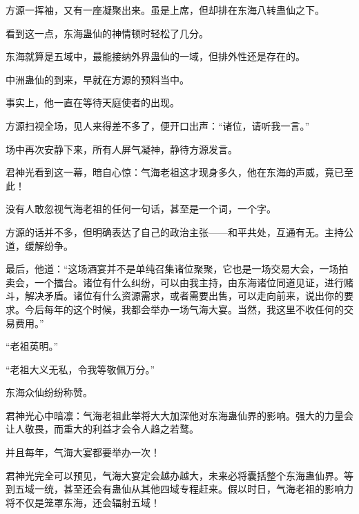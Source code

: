 \begin{this_body}
方源一挥袖，又有一座凝聚出来。虽是上席，但却排在东海八转蛊仙之下。

看到这一点，东海蛊仙的神情顿时轻松了几分。

东海就算是五域中，最能接纳外界蛊仙的一域，但排外性还是存在的。

中洲蛊仙的到来，早就在方源的预料当中。

事实上，他一直在等待天庭使者的出现。

方源扫视全场，见人来得差不多了，便开口出声：“诸位，请听我一言。”

场中再次安静下来，所有人屏气凝神，静待方源发言。

君神光看到这一幕，暗自心惊：气海老祖这才现身多久，他在东海的声威，竟已至此！

没有人敢忽视气海老祖的任何一句话，甚至是一个词，一个字。

方源的话并不多，但明确表达了自己的政治主张——和平共处，互通有无。主持公道，缓解纷争。

最后，他道：“这场酒宴并不是单纯召集诸位聚聚，它也是一场交易大会，一场拍卖会，一个擂台。诸位有什么纠纷，可以由我主持，由东海诸位同道见证，进行赌斗，解决矛盾。诸位有什么资源需求，或者需要出售，可以走向前来，说出你的要求。今后每年的这个时候，我都会举办一场气海大宴。当然，我这里不收任何的交易费用。”

“老祖英明。”

“老祖大义无私，令我等敬佩万分。”

东海众仙纷纷称赞。

君神光心中暗凛：气海老祖此举将大大加深他对东海蛊仙界的影响。强大的力量会让人敬畏，而重大的利益才会令人趋之若鹜。

并且每年，气海大宴都要举办一次！

君神光完全可以预见，气海大宴定会越办越大，未来必将囊括整个东海蛊仙界。等到五域一统，甚至还会有蛊仙从其他四域专程赶来。假以时日，气海老祖的影响力将不仅是笼罩东海，还会辐射五域！

\end{this_body}

